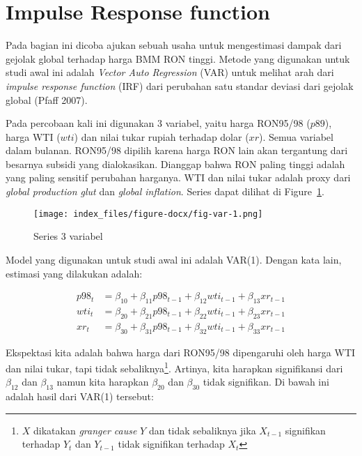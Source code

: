 \documentclass[
  a4paper,
  DIV=11,
  numbers=noendperiod]{scrreprt}
\begin{document}
\hypertarget{impulse-response-function}{%
\section{Impulse Response function}\label{impulse-response-function}}

Pada bagian ini dicoba ajukan sebuah usaha untuk mengestimasi dampak
dari gejolak global terhadap harga BMM RON tinggi. Metode yang digunakan
untuk studi awal ini adalah \emph{Vector Auto Regression} (VAR) untuk
melihat arah dari \emph{impulse response function} (IRF) dari perubahan
satu standar deviasi dari gejolak global (Pfaff 2007).

Pada percobaan kali ini digunakan 3 variabel, yaitu harga RON95/98
(\(p89\)), harga WTI (\(wti\)) dan nilai tukar rupiah terhadap dolar
(\(xr\)). Semua variabel dalam bulanan. RON95/98 dipilih karena harga
RON lain akan tergantung dari besarnya subsidi yang dialokasikan.
Dianggap bahwa RON paling tinggi adalah yang paling sensitif perubahan
harganya. WTI dan nilai tukar adalah proxy dari \emph{global production
glut} dan \emph{global inflation}. Series dapat dilihat di
Figure~\ref{fig-var}.

\begin{figure}

{\centering \texttt{[image: index\_files/figure-docx/fig-var-1.png]}

}

\caption{\label{fig-var}Series 3 variabel}

\end{figure}

Model yang digunakan untuk studi awal ini adalah VAR(1). Dengan kata
lain, estimasi yang dilakukan adalah:

\[
\begin{aligned}
p98_t&=\beta_{10}+\beta_{11} p98_{t-1}+\beta_{12} wti_{t-1}+\beta_{13} xr_{t-1} \\
wti_t&=\beta_{20}+\beta_{21} p98_{t-1}+\beta_{22} wti_{t-1}+\beta_{23} xr_{t-1} \\
xr_t&=\beta_{30}+\beta_{31} p98_{t-1}+\beta_{32} wti_{t-1}+\beta_{33} xr_{t-1}
\end{aligned}
\]

Ekspektasi kita adalah bahwa harga dari RON95/98 dipengaruhi oleh harga
WTI dan nilai tukar, tapi tidak sebaliknya\footnote{\(X\) dikatakan
  \emph{granger cause} \(Y\) dan tidak sebaliknya jika \(X_{t-1}\)
  signifikan terhadap \(Y_t\) dan \(Y_{t-1}\) tidak signifikan terhadap
  \(X_t\)}. Artinya, kita harapkan signifikansi dari \(\beta_{12}\) dan
\(\beta_{13}\) namun kita harapkan \(\beta_{20}\) dan \(\beta_{30}\)
tidak signifikan. Di bawah ini adalah hasil dari VAR(1) tersebut:
\end{document}
